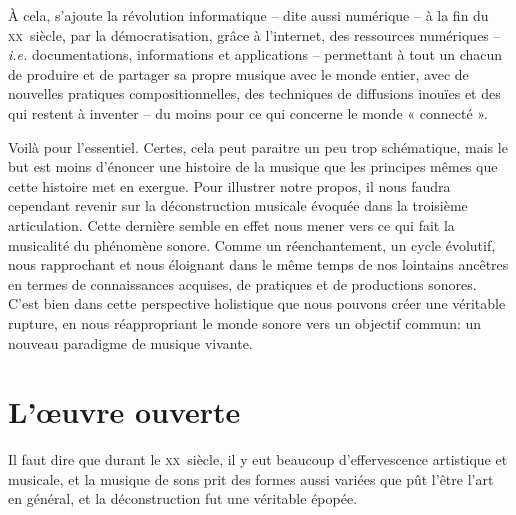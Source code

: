 À cela, s'ajoute la révolution informatique  -- dite aussi numérique --  à la fin du \textsc{xx}\ieme ~siècle,  par la démocratisation, grâce à l'internet, des ressources numériques -- \textit{i.e.} documentations, informations et applications -- permettant à tout un chacun de produire et de partager sa propre musique avec le monde entier, avec de nouvelles pratiques compositionnelles, des techniques de diffusions inouïes et des qui restent à inventer -- du moins pour ce qui concerne le monde « connecté ».

\bigskip

Voilà pour l'essentiel. Certes, cela peut paraitre un peu trop schématique, mais le but est moins d'énoncer une histoire de la musique que les principes mêmes que cette histoire met en exergue. Pour illustrer notre propos, il nous faudra cependant revenir sur la déconstruction musicale évoquée dans la troisième articulation. Cette dernière semble en effet nous mener vers ce qui fait la musicalité du phénomène sonore. Comme un réenchantement, un cycle évolutif, nous rapprochant et nous éloignant dans le même temps de nos lointains ancêtres en termes de connaissances acquises, de pratiques et de productions sonores. C'est bien dans cette perspective holistique que nous pouvons créer une véritable rupture, en nous réappropriant le monde sonore vers un objectif commun: un nouveau paradigme de musique vivante.

\section*{L'œuvre ouverte}
\label{oo}

Il faut dire que durant le \textsc{xx}\ieme ~siècle, il y eut beaucoup d'effervescence artistique et musicale, et la musique de sons prit des formes aussi variées que pût l'être l'art en général, et la déconstruction fut une véritable épopée.

